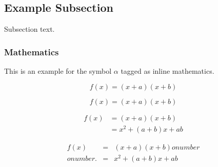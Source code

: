 \documentclass[final,5p,times,twocolumn]{elsarticle}
\begin{document}
\subsection{Example Subsection}
\label{subsec1}

Subsection text.


\subsubsection{Mathematics}
This is an example for the symbol $\alpha$ tagged as inline mathematics.

\begin{equation}
f(x) = (x+a)(x+b)
\end{equation}

\begin{equation*}
f(x) = (x+a)(x+b)
\end{equation*}

\begin{align}
 f(x) &= (x+a)(x+b) \\
      &= x^2 + (a+b)x + ab
\end{align}

\begin{eqnarray}
 f(x) &=& (x+a)(x+b) 
onumber\\ %
onumber.
      &=& x^2 + (a+b)x + ab
\end{eqnarray}
\end{document}

